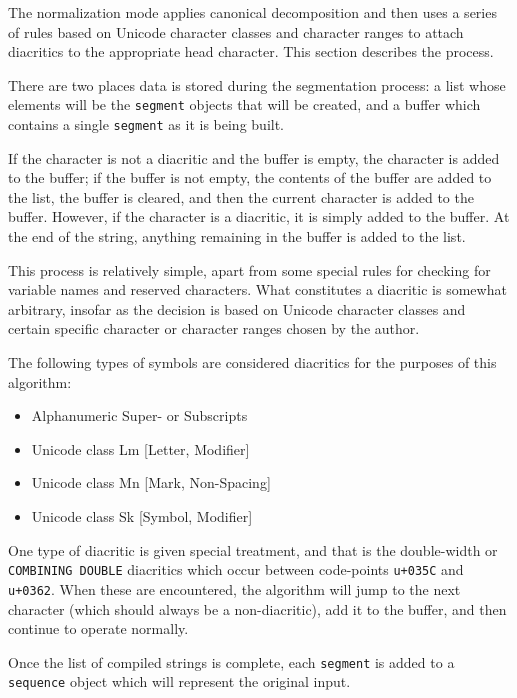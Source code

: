 \documentclass[10pt,letterpaper]{article}
\begin{document}
The normalization mode applies canonical decomposition and then uses a series of rules based on Unicode character classes and character ranges to attach diacritics to the appropriate head character. This section describes the process.

There are two places data is stored during the segmentation process: a list whose elements will be the \texttt{segment} objects that will be created, and a buffer which contains a single \texttt{segment} as it is being built.

If the character is not a diacritic and the buffer is empty, the character is added to the buffer; if the buffer is not empty, the contents of the buffer are added to the list, the buffer is cleared, and then the current character is added to the buffer. However, if the character is a diacritic, it is simply added to the buffer. At the end of the string, anything remaining in the buffer is added to the list.

This process is relatively simple, apart from some special rules for checking for variable names and reserved characters. What constitutes a diacritic is somewhat arbitrary, insofar as the decision is based on Unicode character classes and certain specific character or character ranges chosen by the author.

The following types of symbols are considered diacritics for the purposes of this algorithm:
\begin{itemize}
\itemsep1pt \parskip0pt  
\item Alphanumeric Super- or Subscripts
\item Unicode class Lm [Letter, Modifier]
\item Unicode class Mn [Mark, Non-Spacing]
\item Unicode class Sk [Symbol, Modifier]
\end{itemize}

One type of diacritic is given special treatment, and that is the double-width or \texttt{COMBINING DOUBLE} diacritics which occur between code-points \texttt{u+035C} and \texttt{u+0362}. When these are encountered, the algorithm will jump to the next character (which should always be a non-diacritic), add it to the buffer, and then continue to operate normally.

Once the list of compiled strings is complete, each \texttt{segment} is added to a \texttt{sequence} object which will represent the original input.


\end{document}
